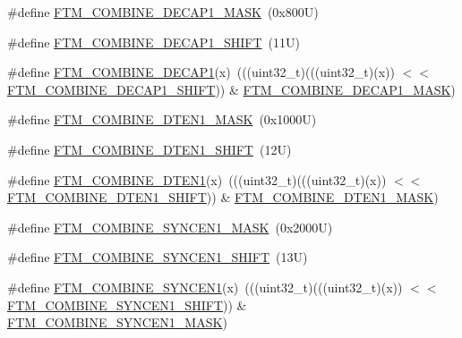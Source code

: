 \begin{DoxyCompactItemize}
\item 
\#define \mbox{\hyperlink{group___f_t_m___register___masks_ga8fdebd40c2860511d58ce7e15cf7a875}{F\+T\+M\+\_\+\+C\+O\+M\+B\+I\+N\+E\+\_\+\+D\+E\+C\+A\+P1\+\_\+\+M\+A\+SK}}~(0x800\+U)
\item 
\#define \mbox{\hyperlink{group___f_t_m___register___masks_ga888ebd3f18cacc007fa0cd2073cdca1d}{F\+T\+M\+\_\+\+C\+O\+M\+B\+I\+N\+E\+\_\+\+D\+E\+C\+A\+P1\+\_\+\+S\+H\+I\+FT}}~(11\+U)
\item 
\#define \mbox{\hyperlink{group___f_t_m___register___masks_gae2a20c64ee4a3990891ef5afedea0e68}{F\+T\+M\+\_\+\+C\+O\+M\+B\+I\+N\+E\+\_\+\+D\+E\+C\+A\+P1}}(x)~(((uint32\+\_\+t)(((uint32\+\_\+t)(x)) $<$$<$ \mbox{\hyperlink{group___f_t_m___register___masks_ga888ebd3f18cacc007fa0cd2073cdca1d}{F\+T\+M\+\_\+\+C\+O\+M\+B\+I\+N\+E\+\_\+\+D\+E\+C\+A\+P1\+\_\+\+S\+H\+I\+FT}})) \& \mbox{\hyperlink{group___f_t_m___register___masks_ga8fdebd40c2860511d58ce7e15cf7a875}{F\+T\+M\+\_\+\+C\+O\+M\+B\+I\+N\+E\+\_\+\+D\+E\+C\+A\+P1\+\_\+\+M\+A\+SK}})
\item 
\#define \mbox{\hyperlink{group___f_t_m___register___masks_ga9d461bde34f5c5fad944a58e61c3fb44}{F\+T\+M\+\_\+\+C\+O\+M\+B\+I\+N\+E\+\_\+\+D\+T\+E\+N1\+\_\+\+M\+A\+SK}}~(0x1000\+U)
\item 
\#define \mbox{\hyperlink{group___f_t_m___register___masks_ga6a1bc35db122f0f887a50b1ac9157657}{F\+T\+M\+\_\+\+C\+O\+M\+B\+I\+N\+E\+\_\+\+D\+T\+E\+N1\+\_\+\+S\+H\+I\+FT}}~(12\+U)
\item 
\#define \mbox{\hyperlink{group___f_t_m___register___masks_gac1916dfac8312b21d827ae5f7e0b8ce2}{F\+T\+M\+\_\+\+C\+O\+M\+B\+I\+N\+E\+\_\+\+D\+T\+E\+N1}}(x)~(((uint32\+\_\+t)(((uint32\+\_\+t)(x)) $<$$<$ \mbox{\hyperlink{group___f_t_m___register___masks_ga6a1bc35db122f0f887a50b1ac9157657}{F\+T\+M\+\_\+\+C\+O\+M\+B\+I\+N\+E\+\_\+\+D\+T\+E\+N1\+\_\+\+S\+H\+I\+FT}})) \& \mbox{\hyperlink{group___f_t_m___register___masks_ga9d461bde34f5c5fad944a58e61c3fb44}{F\+T\+M\+\_\+\+C\+O\+M\+B\+I\+N\+E\+\_\+\+D\+T\+E\+N1\+\_\+\+M\+A\+SK}})
\item 
\#define \mbox{\hyperlink{group___f_t_m___register___masks_gad635d904007b2c80c096efe6f5a8c7c2}{F\+T\+M\+\_\+\+C\+O\+M\+B\+I\+N\+E\+\_\+\+S\+Y\+N\+C\+E\+N1\+\_\+\+M\+A\+SK}}~(0x2000\+U)
\item 
\#define \mbox{\hyperlink{group___f_t_m___register___masks_ga5190e8c0896bf03060b19eb8b4a0c524}{F\+T\+M\+\_\+\+C\+O\+M\+B\+I\+N\+E\+\_\+\+S\+Y\+N\+C\+E\+N1\+\_\+\+S\+H\+I\+FT}}~(13\+U)
\item 
\#define \mbox{\hyperlink{group___f_t_m___register___masks_ga0ebb5f7016c1bda71bf39e292429263e}{F\+T\+M\+\_\+\+C\+O\+M\+B\+I\+N\+E\+\_\+\+S\+Y\+N\+C\+E\+N1}}(x)~(((uint32\+\_\+t)(((uint32\+\_\+t)(x)) $<$$<$ \mbox{\hyperlink{group___f_t_m___register___masks_ga5190e8c0896bf03060b19eb8b4a0c524}{F\+T\+M\+\_\+\+C\+O\+M\+B\+I\+N\+E\+\_\+\+S\+Y\+N\+C\+E\+N1\+\_\+\+S\+H\+I\+FT}})) \& \mbox{\hyperlink{group___f_t_m___register___masks_gad635d904007b2c80c096efe6f5a8c7c2}{F\+T\+M\+\_\+\+C\+O\+M\+B\+I\+N\+E\+\_\+\+S\+Y\+N\+C\+E\+N1\+\_\+\+M\+A\+SK}})
$$
\end{DoxyCompactItemize}
